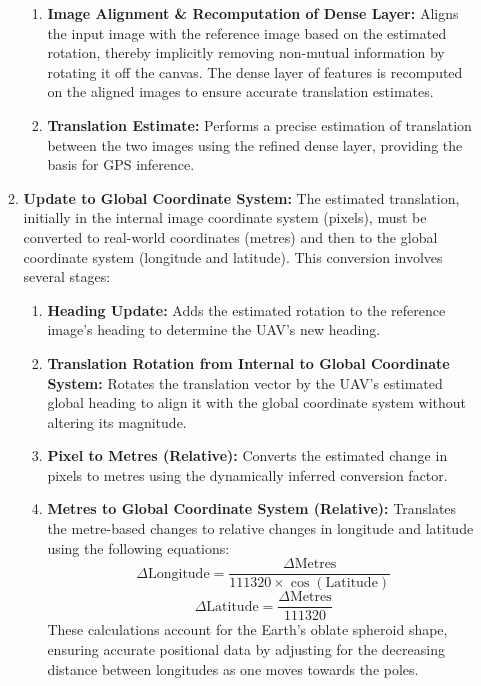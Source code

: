 \begin{enumerate}
\begin{enumerate}
\begin{enumerate}
        \item \textbf{Image Alignment \& Recomputation of Dense Layer:}  
        Aligns the input image with the reference image based on the estimated rotation, thereby implicitly removing non-mutual information by rotating it off the canvas. The dense layer of features is recomputed on the aligned images to ensure accurate translation estimates.
        
        \item \textbf{Translation Estimate:}  
        Performs a precise estimation of translation between the two images using the refined dense layer, providing the basis for GPS inference.
    \end{enumerate}

    \item \textbf{Update to Global Coordinate System:}  
    The estimated translation, initially in the internal image coordinate system (pixels), must be converted to real-world coordinates (metres) and then to the global coordinate system (longitude and latitude). This conversion involves several stages:
    \begin{enumerate}
        \item \textbf{Heading Update:}  
        Adds the estimated rotation to the reference image's heading to determine the UAV's new heading.
        
        \item \textbf{Translation Rotation from Internal to Global Coordinate System:}  
        Rotates the translation vector by the UAV's estimated global heading to align it with the global coordinate system without altering its magnitude.
        
        \item \textbf{Pixel to Metres (Relative):}  
        Converts the estimated change in pixels to metres using the dynamically inferred conversion factor. 
        
        \item \textbf{Metres to Global Coordinate System (Relative):}  
        Translates the metre-based changes to relative changes in longitude and latitude using the following equations:
        \begin{equation}
            \Delta \text{Longitude} = \frac{\Delta \text{Metres}}{111320 \times \cos(\text{Latitude})}
        \end{equation}
        \begin{equation}
            \Delta \text{Latitude} = \frac{\Delta \text{Metres}}{111320}
        \end{equation}
        These calculations account for the Earth's oblate spheroid shape, ensuring accurate positional data by adjusting for the decreasing distance between longitudes as one moves towards the poles.
        

\end{enumerate}
\end{enumerate}
\end{enumerate}
